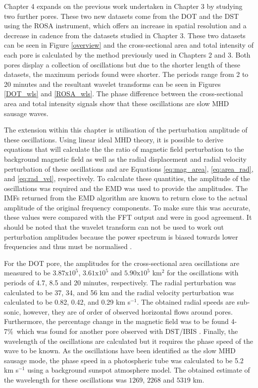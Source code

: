     Chapter 4 expands on the previous work undertaken in Chapter 3 by studying two further pores.
    These two new datasets come from the DOT and the DST using the ROSA instrument, which offers an increase in spatial resolution and a decrease in cadence from the datasets studied in Chapter 3.
    These two datasets can be seen in Figure \ref{overview} and the cross-sectional area and total intensity of each pore is calculated by the method previously used in Chapters 2 and 3. 
    Both pores display a collection of oscillations but due to the shorter length of these datasets, the maximum periods found were shorter.
    The periods range from 2 to 20 minutes and the resultant wavelet transforms can be seen in Figures \ref{DOT_wls} and \ref{ROSA_wls}.     
    The phase difference between the cross-sectional area and total intensity signals show that these oscillations are slow MHD sausage waves.
    
    The extension within this chapter is utilisation of the perturbation amplitude of these oscillations.
    Using linear ideal MHD theory, it is possible to derive equations that will calculate the the ratio of magnetic field perturbation to the background magnetic field as well as the radial displacement and radial velocity perturbation of these oscillations and are Equations \ref{eq:mag_area}, \ref{eq:area_rad}, and \ref{eq:rad_vel}, respectively. 
    To calculate these quantities, the amplitude of the oscillations was required and the EMD was used to provide the amplitudes.
    The IMFs returned from the EMD algorithm are known to return close to the actual amplitude of the original frequency components.
    To make sure this was accurate, these values were compared with the FFT output and were in good agreement.
	It should be noted that the wavelet transform can not be used to work out perturbation amplitudes  because the power spectrum is biased towards lower frequencies and thus must be normalised \citep{liu2007rectification}.
  
    For the DOT pore, the amplitudes for the cross-sectional area oscillations are measured to be $3.87\mathrm{x}10^5$, $3.61\mathrm{x}10^5$ and $5.90\mathrm{x}10^5$ km$^2$ for the oscillations with periods of 4.7, 8.5 and 20 minutes, respectively.
    The radial perturbation was calculated to be 37, 34, and 56 km and the radial velocity perturbation was calculated to be 0.82, 0.42, and 0.29 km s$^{-1}$.
    The obtained radial speeds are sub-sonic, however, they are of order of observed horizontal flows around pores.
    Furthermore, the percentage change in the magnetic field was to be found 4-7\%\ which was found for another pore observed with DST/IBIS \citep{0004-637X-806-1-132}.
    Finally, the wavelength of the oscillations are calculated but it requires the phase speed of the wave to be known.
    As the oscillations have been identified as the slow MHD sausage mode, the phase speed in a photospheric tube was calculated to be 5.2 km s$^{-1}$ using a background sunspot atmosphere model.
    The obtained estimate of the wavelength for these oscillations was $1269$, $2268$ and $5319$ km.
       
